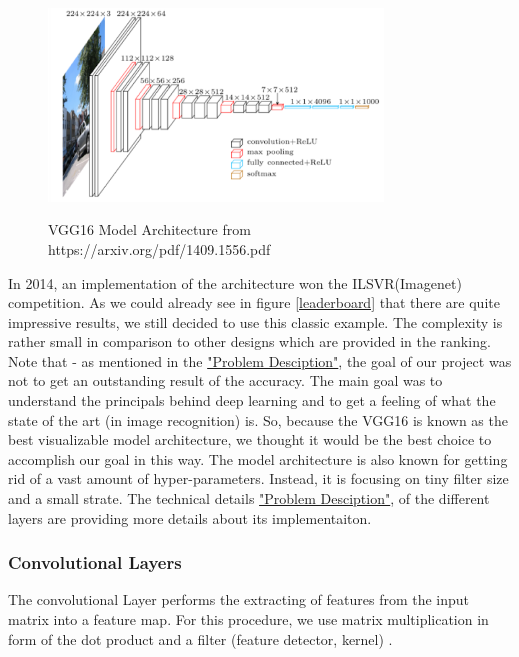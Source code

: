 \documentclass[journal]{IEEEtran}
\begin{document}
\begin{figure}
  \begin{center}
	  \includegraphics[width=3.5in]{photo/vgg16.png}\\
  \caption{VGG16 Model Architecture from https://arxiv.org/pdf/1409.1556.pdf}\label{vgg16}
  \end{center}
\end{figure}

In 2014, an implementation of the architecture won the ILSVR(Imagenet) competition. As we could already see in figure \ref{leaderboard} that there are quite impressive results, we still decided to use this classic example. The complexity is rather small in comparison to other designs which are provided in the ranking. Note that - as  mentioned in the \hyperref[sec:problemDescription]{"Problem Desciption"}, the goal of our project was not to get an outstanding result of the accuracy. The main goal was  to understand the principals behind deep learning and to get a feeling of what the state of the art (in image recognition) is. So, because the VGG16 is known as the best visualizable model architecture, we thought it would be the best choice to accomplish our goal in this way. The model architecture is also known for getting rid of a vast amount of hyper-parameters. Instead, it is focusing on tiny filter size and a small strate. The technical details \hyperref[sec:techDetails]{"Problem Desciption"}, of the different layers are providing more details about its implementaiton. 
\subsubsection{Convolutional Layers}
\noindent The convolutional Layer performs the extracting of features from the input matrix into a feature map. For this procedure, we use matrix multiplication in form of the dot product and a filter (feature detector, kernel) \cite{Goodfellow-et-al-2016}. 
\end{document}
